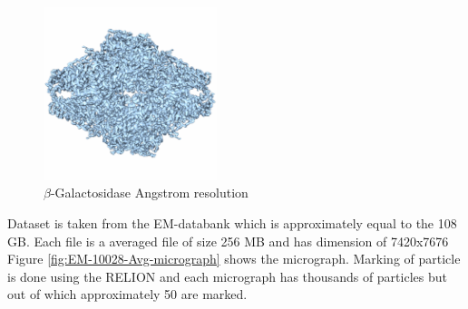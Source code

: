 \documentclass[twoside]{iitbreport}
\begin{document}
\begin{figure}[h]
\includegraphics[width=0.45\textwidth]{EMPIAR-10012}
\centering
\captionsetup{justification=centering}
\caption{ $\beta$-Galactosidase\protect{} Angstrom resolution}
\label{fig:EMPIAR-10012-3d-struct}
\end{figure}

Dataset is taken from the EM-databank which is approximately equal to the 108 GB. Each file is a averaged file of size 256 MB and has dimension of 7420x7676 Figure \ref{fig:EM-10028-Avg-micrograph} shows the micrograph. Marking of particle is done using the RELION and each micrograph has thousands of particles but out of which approximately 50 are marked.
\end{document}

